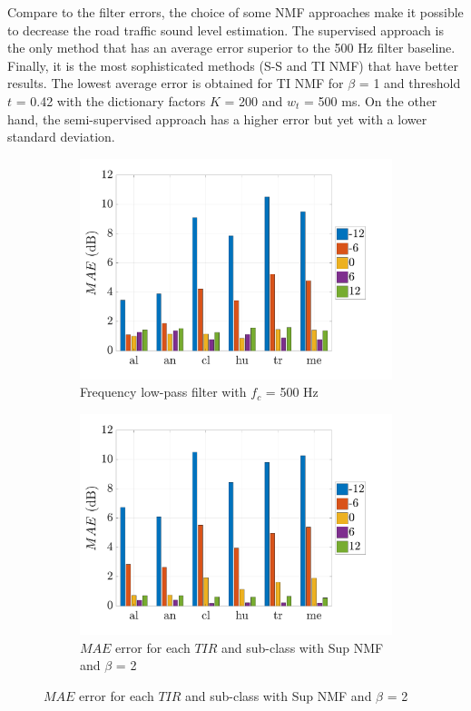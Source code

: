 \documentclass[twocolumn,a4paper,10pt]{article}
\begin{document}
Compare to the filter errors, the choice of some NMF approaches make it possible to decrease the road traffic sound level estimation. The supervised approach is the only method that has an average error superior to the 500 Hz filter baseline. Finally, it is the most sophisticated methods (S-S and TI NMF) that have better results. The lowest average error is obtained for TI NMF for $\beta$ = 1 and threshold $t$ = 0.42 with the dictionary factors $K$ = 200 and $w_t$ = 500 ms. On the other hand, the semi-supervised approach has a higher error but yet with a lower standard deviation.

\begin{figure}[t]
    \centering
    \begin{subfigure}[t]{0.45\textwidth}
        \centering
        \includegraphics[width=\linewidth]{figures/filter_bar.pdf}
        \caption{Frequency low-pass filter with $f_c$ = 500 Hz}
        \label{fig:TIR_class_filter}
    \end{subfigure}%
    \hfill
    \begin{subfigure}[t]{0.45\textwidth}
        \centering
        \includegraphics[width=\linewidth]{figures/sup_bar.pdf}
        \caption{$MAE$ error for each $TIR$ and sub-class with Sup NMF and $\beta$ = 2}
                \label{fig:TIR_class_sup}
    \end{subfigure}


\end{figure}
\end{document}
